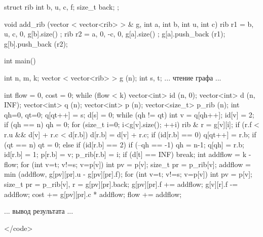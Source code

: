 struct rib {
	int b, u, c, f;
	size_t back;
};

void add_rib (vector < vector<rib> > & g, int a, int b, int u, int c) {
	rib r1 = { b, u, c, 0, g[b].size() };
	rib r2 = { a, 0, -c, 0, g[a].size() };
	g[a].push_back (r1);
	g[b].push_back (r2);
}

int main()
{
	int n, m, k;
	vector < vector<rib> > g (n);
	int s, t;
	... чтение графа ...

	int flow = 0,  cost = 0;
	while (flow < k) {
		vector<int> id (n, 0);
		vector<int> d (n, INF);
		vector<int> q (n);
		vector<int> p (n);
		vector<size_t> p_rib (n);
		int qh=0, qt=0;
		q[qt++] = s;
		d[s] = 0;
		while (qh != qt) {
			int v = q[qh++];
			id[v] = 2;
			if (qh == n)  qh = 0;
			for (size_t i=0; i<g[v].size(); ++i) {
				rib & r = g[v][i];
				if (r.f < r.u && d[v] + r.c < d[r.b]) {
					d[r.b] = d[v] + r.c;
					if (id[r.b] == 0) {
						q[qt++] = r.b;
						if (qt == n)  qt = 0;
					}
					else if (id[r.b] == 2) {
						if (--qh == -1)  qh = n-1;
						q[qh] = r.b;
					}
					id[r.b] = 1;
					p[r.b] = v;
					p_rib[r.b] = i;
				}
			}
		}
		if (d[t] == INF)  break;
		int addflow = k - flow;
		for (int v=t; v!=s; v=p[v]) {
			int pv = p[v];  size_t pr = p_rib[v];
			addflow = min (addflow, g[pv][pr].u - g[pv][pr].f);
		}
		for (int v=t; v!=s; v=p[v]) {
			int pv = p[v];  size_t pr = p_rib[v],  r = g[pv][pr].back;
			g[pv][pr].f += addflow;
			g[v][r].f -= addflow;
			cost += g[pv][pr].c * addflow;
		}
		flow += addflow;
	}

	... вывод результата ...

}</code>